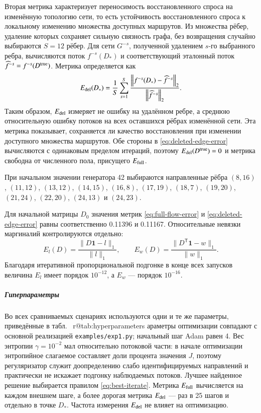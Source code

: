 \documentclass{crm-article}
\makeatletter
\def\CRMfirstoffields#1#2#3\null{#1}
\renewcommand{\ref}[1]{%
  \expandafter\let\expandafter\CRMreftemp\csname r@#1\endcsname
  \@setref\CRMreftemp\CRMfirstoffields{#1}}
\makeatother
\begin{document}
Вторая метрика характеризует переносимость восстановленного спроса на
изменённую топологию сети, то есть устойчивость восстановленного спроса к
локальному изменению множества доступных маршрутов. Из множества рёбер, удаление которых сохраняет
сильную связность графа, без возвращения случайно выбираются $S=12$ рёбер.
Для сети $G^{-s}$, полученной удалением $s$-го выбранного ребра, вычисляются
поток $f^{-s}(D_*)$ и соответствующий эталонный поток $\widehat f^{-s}=f^{-s}(D^{\rm true})$.
Метрика определяется как
\begin{gather}
 E_{\rm del}(D_*)=\frac{1}{S}\sum\limits_{s=1}^{S}
 \frac{\left\|f^{-s}(D_*)-\widehat f^{-s}\right\|_2}
 {\left\|\widehat f^{-s}\right\|_2}.
 \label{eq:deleted-edge-error}
\end{gather}
Таким образом, $E_{\rm del}$ измеряет не ошибку на удалённом ребре, а среднюю
относительную ошибку потоков на всех оставшихся рёбрах изменённой сети. Эта
метрика показывает, сохраняется ли качество восстановления при изменении
доступного множества маршрутов. Обе стороны в
\eqref{eq:deleted-edge-error} вычисляются с одинаковым пределом итераций,
поэтому $E_{\rm del}(D^{\rm true})=0$ и метрика свободна от численного
пола, присущего $E_{\rm full}$.

При начальном значении генератора 42 выбираются направленные рёбра
$(8,16)$, $(11,12)$, $(13,12)$, $(14,15)$, $(16,8)$, $(17,19)$,
$(18,7)$, $(19,20)$, $(21,24)$, $(22,20)$, $(24,13)$ и $(24,23)$.

Для начальной матрицы $D_0$ значения метрик
\eqref{eq:full-flow-error} и \eqref{eq:deleted-edge-error} равны
соответственно 0.11396 и 0.11167. Относительные невязки маргиналий
контролируются отдельно:
\[
 E_l(D)=
 \frac{\lVert D\boldsymbol{1}-l\rVert_1}{\lVert l\rVert_1},
 \qquad
 E_w(D)=
 \frac{\lVert D^{\mathsf T}\boldsymbol{1}-w\rVert_1}{\lVert w\rVert_1}.
\]
Благодаря итеративной пропорциональной подгонке в конце всех запусков величина $E_l$ имеет порядок
$10^{-12}$, а $E_w$ --- порядок $10^{-16}$.

\subparagraph{Гиперпараметры}

Во всех сравниваемых сценариях используются одни и те же параметры,
приведённые в табл.~\ref{tab:hyperparameters}. Параметры оптимизации совпадают
с основной реализацией \texttt{examples/exp1.py}; начальный шаг Adam равен 4.
Вес энтропии $\gamma=10^{-2}$ мал относительно потоковой части: в начале
оптимизации энтропийное слагаемое составляет доли процента значения $J$,
поэтому регуляризатор служит доопределению слабо идентифицируемых
направлений и практически не искажает подгонку наблюдаемых потоков.
Лучшее найденное решение выбирается правилом \eqref{eq:best-iterate}. Метрика
$E_{\rm full}$ вычисляется на каждом внешнем шаге, а более дорогая метрика
$E_{\rm del}$ --- раз в 25 шагов и отдельно в точке $D_*$. Частота измерения
$E_{\rm del}$ не влияет на оптимизацию.
\end{document}
